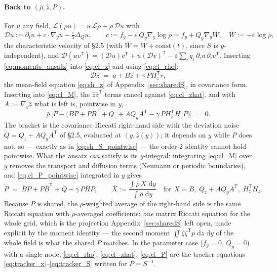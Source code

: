 \documentclass[11pt,a4paper]{article}
\newcommand{\dd}{\,\mathrm{d}}
\newcommand{\T}{^{\mathsf T}}
\newcommand{\zh}{\hat{z}}
\newcommand{\eps}{\varepsilon}
\newcommand{\gy}{\nabla_{\!y}}
\theoremstyle{plain}
\theoremstyle{definition}
\theoremstyle{remark}
\begin{document}
\paragraph{Back to $(\bar\rho,\zh,P)$.} For $u$ any field, $\mathcal L(\bar\rho u) = u\,\mathcal L\bar\rho + \bar\rho\,\mathcal D u$ with
\begin{equation}
  \mathcal D u := \partial_tu + c\cdot\gy u - \tfrac\eps2\Delta_Qu, \qquad c := f_y - \eps\,Q_y\gy\log\bar\rho = f_y + Q_y\gy\bar W, \quad \bar W := -\eps\log\bar\rho ,
  \label{eq:D_op}
\end{equation}
the characteristic velocity of \S2.5 (with $\bar W = W + \text{const}(t)$, since $S$ is $y$-independent), and $\mathcal D(uv\T) = (\mathcal Du)v\T + u(\mathcal Dv)\T - \eps\sum_iq_i\,\partial_iu\,\partial_iv\T$. Inserting \eqref{eq:moments_ansatz} into \eqref{eq:cl_z} and using \eqref{eq:cl_rho}:
\begin{equation}
  \mathcal D\zh \;=\; a + B\zh + \gamma\,PH_z\T r ,
  \label{eq:cl_zhat}
\end{equation}
the mean-field equation \eqref{eq:sh_z} of Appendix~\ref{sec:sharedS}, in covariance form. Inserting into \eqref{eq:cl_M}, the $\zh\zh\T$ terms cancel against \eqref{eq:cl_zhat}, and with $A := \gy\zh$ what is left is, pointwise in $y$,
\begin{equation}
  \bar\rho\,\Big[\dot P - \big(BP + PB\T + Q_z + AQ_yA\T - \gamma\,PH_z\T H_zP\big)\Big] \;=\; 0 .
  \label{eq:cl_P_pointwise}
\end{equation}
The bracket is the covariance Riccati right-hand side with the deviation noise $\tilde Q = Q_z + AQ_yA\T$ of \S2.5, evaluated at $(y,\zh(y))$; it depends on $y$ while $\dot P$ does not, so --- exactly as in \eqref{eq:sh_S_pointwise} --- the order-2 identity cannot hold pointwise. What the ansatz \emph{can} satisfy is its $y$-integral: integrating \eqref{eq:cl_M} over $y$ removes the transport and diffusion terms (Neumann or periodic boundaries), and \eqref{eq:cl_P_pointwise} integrated in $y$ gives
\begin{equation}
  \dot P \;=\; \bar BP + P\bar B\T + \bar Q - \gamma\,P\bar HP, \qquad
  \bar X := \frac{\int\bar\rho\,X\,\dd y}{\int\bar\rho\,\dd y} \quad\text{for } X = B,\; Q_z + AQ_yA\T,\; H_z\T H_z .
  \label{eq:cl_P}
\end{equation}
Because $P$ is shared, the $\bar\rho$-weighted average of the right-hand side is the same Riccati equation with $\bar\rho$-averaged coefficients: \emph{one} matrix Riccati equation for the whole grid, which is the projection Appendix~\ref{sec:sharedS} left open, made explicit by the moment identity --- the second moment $\iint\zeta\zeta\T p\,\dd z\,\dd y$ of the whole field is what the shared $P$ matches. In the parameter case ($f_y=0$, $Q_y=0$) with a single node, \eqref{eq:cl_rho}, \eqref{eq:cl_zhat}, \eqref{eq:cl_P} are the tracker equations \eqref{eq:tracker_x}--\eqref{eq:tracker_S} written for $P=S^{-1}$.
\end{document}
